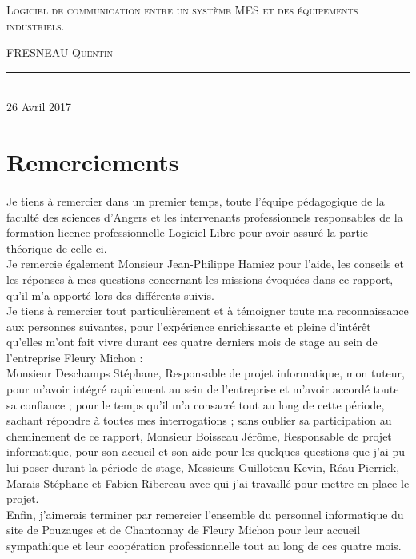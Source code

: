 \documentclass[a4paper,12pt]{extarticle}
\newcommand{\HRule}{\rule{\linewidth}{0.5mm}}
\begin{document}
\begin{titlepage}
\begin{sffamily}
\begin{center}
		\textsc{\LARGE Logiciel de communication entre un système MES et des équipements industriels.}\\[2cm] 
		
		\begin{minipage}{0.4\textwidth}
			\begin{flushleft} \large
				FRESNEAU \textsc{Quentin}
			\end{flushleft}
		\end{minipage}
		
		\vfill
		\HRule\\[2cm]
		{\large 26 Avril 2017}
		
		\end{center}
		\end{sffamily}
	\end{titlepage}
	\clearpage
	
	\tableofcontents
	\clearpage

	\section{Remerciements}
		\paragraph{}
			
	Je tiens à remercier dans un premier temps, toute l’équipe pédagogique de la faculté des sciences d’Angers et les intervenants professionnels responsables de la formation licence professionnelle Logiciel Libre pour avoir assuré la partie théorique de celle-ci.\\
Je remercie également Monsieur Jean-Philippe Hamiez pour l’aide, les conseils et les réponses à mes questions concernant les missions évoquées dans ce rapport, qu’il m’a apporté lors des différents suivis.\\
Je tiens à remercier tout particulièrement et à témoigner toute ma reconnaissance aux personnes suivantes, pour l’expérience enrichissante et pleine d’intérêt qu’elles m’ont fait vivre durant ces quatre derniers mois de stage au sein de l’entreprise Fleury Michon : \\
Monsieur Deschamps Stéphane, Responsable de projet informatique, mon tuteur, pour m’avoir intégré rapidement au sein de l’entreprise et m’avoir accordé toute sa confiance ; pour le temps qu’il m’a consacré tout au long de cette période, sachant répondre à toutes mes interrogations ; sans oublier sa participation au cheminement de ce rapport, Monsieur Boisseau Jérôme, Responsable de projet informatique, pour son accueil et son aide pour les quelques questions que j’ai pu lui poser durant la période de stage, Messieurs Guilloteau Kevin, Réau Pierrick, Marais Stéphane et Fabien Ribereau avec qui j’ai travaillé pour mettre en place le projet.\\
Enfin, j’aimerais terminer par remercier l’ensemble du personnel informatique du site de Pouzauges et de Chantonnay de Fleury Michon pour leur accueil sympathique et leur coopération professionnelle tout au long de ces quatre mois.\\
	
\end{document}
